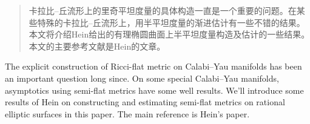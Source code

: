 

\begin{abstract}
 卡拉比--丘流形上的里奇平坦度量的具体构造一直是一个重要的问题。在某些特殊的卡拉比--丘流形上，用半平坦度量的渐进估计有一些不错的结果。本文将介绍Hein给出的有理椭圆曲面上半平坦度量构造及估计的一些结果。本文的主要参考文献是Hein的文章\cite{hein2012gravitational}。

\end{abstract}

\begin{abstract*}
The explicit construction of Ricci-flat metric on Calabi--Yau manifolds has been an important question long since. On some special Calabi--Yau manifolds, asymptotics using semi-flat metrics have some well results. We'll introduce some results of Hein on constructing and estimating semi-flat metrics on rational elliptic surfaces in this paper. The main reference is Hein's paper\cite{hein2012gravitational}.

\end{abstract*}
